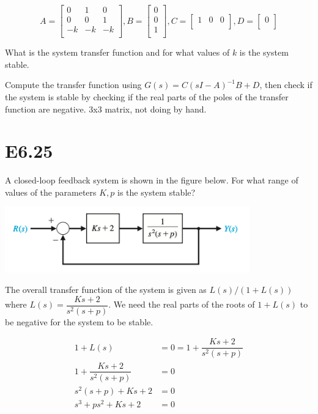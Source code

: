 \documentclass[11pt]{article}
\begin{document}
\[
  A = \begin{bmatrix}
    0 & 1 & 0 \\
    0 & 0 & 1 \\
    -k & -k & -k \\
  \end{bmatrix}
  ,
  B = \begin{bmatrix}
    0 \\
    0 \\
    1 \\
  \end{bmatrix}
  ,
  C = \begin{bmatrix}
    1 & 0 & 0 \\
  \end{bmatrix}
  ,
  D = \begin{bmatrix}
    0 \\
  \end{bmatrix}
\]

What is the system transfer function and for what values of $k$ is the system stable.

Compute the transfer function using $G(s) = C (sI - A)^{-1} B + D$, then check if the system is stable by checking if the real parts of the poles of the transfer function are negative. 3x3 matrix, not doing by hand.

\section{E6.25}

A closed-loop feedback system is shown in the figure below. For what range of values of the parameters $K, p$ is the system stable?

\includegraphics[width=300pt]{e6.25.png}

The overall transfer function of the system is given as $L(s) / (1 + L(s))$ where $L(s) = \dfrac{Ks + 2}{s^2(s + p)}$. We need the real parts of the roots of $1 + L(s)$ to be negative for the system to be stable.

\begin{align*}
  1 + L(s) &= 0 = 1 + \dfrac{Ks + 2}{s^2(s + p)} \\
  1 + \dfrac{Ks + 2}{s^2(s + p)} &= 0 \\
  s^2(s + p) + Ks + 2 &= 0 \\
  s^3 + ps^2 + Ks + 2 &= 0 \\
\end{align*}
\end{document}
